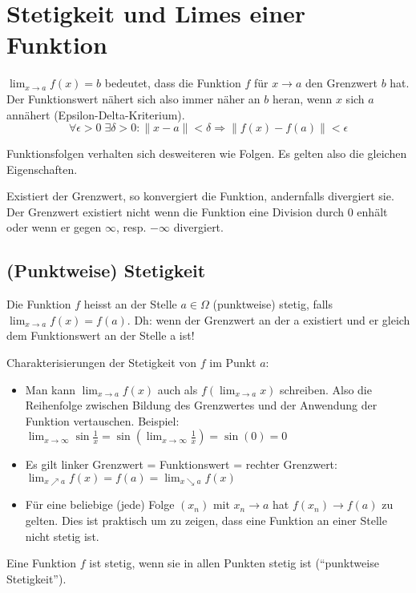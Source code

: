 \section{Stetigkeit und Limes einer Funktion}
$\lim_{x \to a} f(x) = b$ bedeutet, dass die Funktion $f$ für $x \to a$ den
Grenzwert $b$ hat. Der Funktionswert nähert sich also immer näher an $b$ heran,
wenn $x$ sich $a$ annähert (Epsilon-Delta-Kriterium).
\[
\forall \epsilon > 0 \; \exists \delta > 0: \|x -a\| < \delta \Rightarrow
\|f(x) - f(a)\| < \epsilon
\]

Funktionsfolgen verhalten sich desweiteren wie Folgen. Es gelten also die
gleichen Eigenschaften.

Existiert der Grenzwert, so konvergiert die Funktion, andernfalls divergiert sie. 
Der Grenzwert existiert nicht wenn die Funktion eine Division durch 0 enhält oder 
wenn er gegen $\infty$, resp. $-\infty$ divergiert.

\subsection{(Punktweise) Stetigkeit}
\begin{definition} 
Die Funktion $f$ heisst an der Stelle $a \in \Omega$ (punktweise) stetig, falls $\lim_{x \to a} f(x) = f(a)$. Dh: wenn der Grenzwert an der a existiert und er gleich dem Funktionswert an der Stelle a ist!
\end{definition}

Charakterisierungen der Stetigkeit von $f$ im Punkt $a$:
\begin{itemize}
	\item Man kann $\lim_{x \to a} f(x)$ auch als $f(\lim_{x \to a} x)$ schreiben.
	Also die Reihenfolge zwischen Bildung des Grenzwertes und der Anwendung der
	Funktion vertauschen. Beispiel: $\lim_{x \to \infty} \sin\frac{1}{x} =
	\sin(\lim_{x \to \infty} \frac{1}{x}) = \sin(0) = 0$
	\item Es gilt linker Grenzwert = Funktionswert = rechter Grenzwert: $\lim_{x
	\nearrow a} f(x) = f(a) = \lim_{x \searrow a} f(x)$
	\item Für eine beliebige (jede) Folge $(x_n)$ mit $x_n \to a$ hat $f(x_n) \to
	f(a)$ zu gelten. Dies ist praktisch um zu zeigen, dass eine Funktion an einer
	Stelle nicht stetig ist.
\end{itemize}

Eine Funktion $f$ ist stetig, wenn sie in allen Punkten stetig ist
(``punktweise Stetigkeit'').

